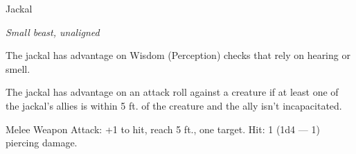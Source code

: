 \begin{monsterbox}{Jackal}
\begin{hangingpar}
\textit{Small beast, unaligned}
\end{hangingpar}
\dndline%
\basics[%
armorclass = 12,
hitpoints = 1d6,
speed = {40 ft.}
]
\dndline%
\stats[%
STR = \stat{8},
DEX = \stat{15},
CON = \stat{11},
INT = \stat{3},
WIS = \stat{12},
CHA = \stat{6}
]
\dndline%
\details[%
skills={Perception +3, },
damageimmunities={},
savingthrows={},
conditionimmunities={},
damageresistances={},
damagevulnerabilities={},
senses={passive Perception 13},
challenge=0
]
\dndline%
\begin{monsteraction}
The jackal has advantage on Wisdom (Perception) checks that rely on hearing or smell.
\end{monsteraction}
\begin{monsteraction}
The jackal has advantage on an attack roll against a creature if at least one of the jackal's allies is within 5 ft. of the creature and the ally isn't incapacitated.
\end{monsteraction}
\begin{monsteraction}[Bite]
Melee Weapon Attack: +1 to hit, reach 5 ft., one target. Hit: 1 (1d4 — 1) piercing damage.
\end{monsteraction}
\end{monsterbox}
